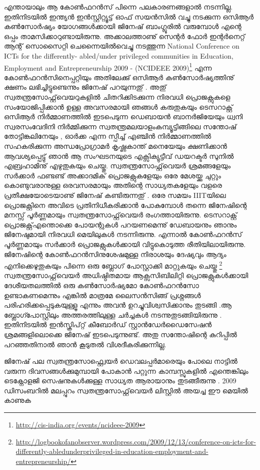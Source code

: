 എന്തായാലും ആ കോണ്‍ഫറന്‍സ് പിന്നെ പലകാരണങ്ങളാല്‍ നടന്നില്ല. ഇതിനിടയില്‍ ഇന്ത്യന്‍ ഇന്‍സ്റ്റിറ്റ്യൂട്ട് ഓഫ് സയന്‍സില്‍ വച്ചു നടക്കുന്ന ഒസിആര്‍ കണ്‍സോര്‍ഷ്യം  യോഗങ്ങള്‍ക്കായി ജിനേഷ് ബാംഗ്ലൂരില്‍ വരുമ്പോള്‍ എന്റെ ഒപ്പം താമസിക്കാറുണ്ടായിരുന്നു. അക്കാലത്താണു് സെന്റര്‍ ഫോര്‍ ഇന്റര്‍നെറ്റ് ആന്റ് സൊസൈറ്റി ചെന്നൈയില്‍വെച്ചു നടത്തുന്ന National Conference on ICTs for the differently- abled/under privileged communities in Education, Employment and Entrepreneurship 2009 - (NCIDEEE 2009)\footnote{\url{http://cis-india.org/events/ncideee-2009}} എന്ന കോണ്‍ഫറന്‍സിനെപ്പറ്റിയും അതിലേക്കു് ഒസിആര്‍ കണ്‍സോര്‍ഷ്യത്തിനു് ക്ഷണം ലഭിച്ചിട്ടുണ്ടെന്നും ജിനേഷ് പറയുന്നതു് . അതു് സ്വതന്ത്രസോഫ്റ്റ്‌വെയറുകളില്‍ ചിതറിക്കിടക്കുന്ന നിരവധി പ്രൊജക്റ്റുകളെ സംയോജിപ്പിക്കാന്‍ ഉള്ള അവസരമായി ഞങ്ങള്‍ കരുതുകയും ടെസറാക്റ്റ് ഒസിആര്‍ നിര്‍മ്മാണത്തില്‍ ഇടപെടുന്ന ഡെബായന്‍ ബാനര്‍ജിയേയും ധ്വനി സ്വരസംവേദിനി നിര്‍മ്മിക്കുന്ന സ്വതന്ത്രമലയാളംകമ്പ്യൂട്ടിങ്ങിലെ  സന്തോഷ് തോട്ടിങ്കലിനേയും , ഓര്‍ക്ക എന്ന സ്പീച്ച് എഞ്ചിന്‍ നിര്‍മ്മാണത്തില്‍ സഹകരിക്കുന്ന അന്ധപ്രോഗ്രാമര്‍ കൃഷ്ണകാന്ത് മനെയേയും ക്ഷണിക്കാന്‍ ആവശ്യപ്പെട്ടു് ഞാന്‍ ആ സംഘടനയുടെ എക്സിക്യുട്ടീവ് ഡയറക്ടര്‍ സുനില്‍ എബ്രഹാമിനു് എഴുതുകയും ചെയ്തു. സ്വതന്ത്രസോഫ്റ്റ്‌വെയര്‍ ശ്രമങ്ങളേയും സര്‍ക്കാര്‍ ഫണ്ടണ്ട് അക്കാദമിക് പ്രൊജക്റ്റുകളേയും ഒരേ മേശയ്ക്കു ചുറ്റും കൊണ്ടുവരാനുള്ള ഒരവസരമായും അതിന്റെ സാധ്യതകളേയും വളരെ പ്രതീക്ഷയോടെയാണു് ജിനേഷ് കണ്ടിരുന്നതു് . ഒരേ സമയം IIITയിലെ പ്രൊജക്റ്റിനെ അവിടെ പ്രതിനിധീകരിക്കാന്‍ പോകുമ്പോള്‍ തന്നെ ജിനേഷിന്റെ മനസ്സ് പൂര്‍ണ്ണമായും സ്വതന്ത്രസോഫ്റ്റ്‌വെയര്‍ രംഗത്തായിരുന്നു. ടെസറാക്റ്റ് പ്രൊജക്റ്റ്എന്തൊക്കെ  പോയന്റുകള്‍ പറയണമെന്നു് ഡേബായനും ഞാനും ജിനേഷുമായി നിരവധി മെയിലുകള്‍ നടന്നിരുന്നു. എന്നാല്‍ കോണ്‍ഫറന്‍സ് പൂര്‍ണ്ണമായും സര്‍ക്കാര്‍ പ്രൊജക്റ്റുകള്‍ക്കായി വിട്ടുകൊടുത്ത രീതിയിലായിരുന്നു. ജിനേഷിന്റെ കോണ്‍ഫറന്‍സിനുശേഷമുള്ള നിരാശയും ദേഷ്യവും ആദ്യം എനിക്കെഴുതുകയും പിന്നെ  ഒരു ബ്ലോഗ് പോസ്റ്റാക്കി മാറ്റുകയും ചെയ്തു \footnote{\url{http://logbookofanobserver.wordpress.com/2009/12/13/conference-on-icts-for-differently-abledunderprivileged-in-education-employment-and-entrepreneurship/}} സ്വതന്ത്രസോഫ്റ്റ്‌വെയര്‍ അധിഷ്ഠിതമായ ആക്സസിബിലിറ്റി പ്രൊജക്റ്റുകള്‍ക്കായി ദേശീയതലത്തില്‍ ഒരു കണ്‍സോര്‍ഷ്യമോ കോണ്‍ഫറന്‍സോ ഉണ്ടാകണമെന്നും എങ്കില്‍ മാത്രമേ ലൈസന്‍സിങ്ങ് പ്രശ്നങ്ങള്‍ പരിഹരിക്കപ്പെടുകയുള്ളൂ എന്നും അവന്‍ ഉറച്ചുവിശ്വസിക്കാനും തുടങ്ങി .ആ ബ്ലോഗ്പോസ്റ്റിലും അത്തരത്തിലുള്ള ചര്‍ച്ചകള്‍ നടന്നുതുടങ്ങിയിരുന്നു . ഇതിനിടയില്‍ ഇന്‍സ്ക്രിപ്റ്റ് കീബോര്‍ഡ് സ്റ്റാന്‍ഡേര്‍ഡൈസേഷന്‍ ശ്രമങ്ങളിലൊക്കെ ജിനേഷ് ഇടപെടുന്നുണ്ട്. അതു സന്തോഷിന്റെ കുറിപ്പില്‍ പറഞ്ഞതിനാല്‍ ഞാന്‍ കൂടുതല്‍ വിശദീകരിക്കുന്നില്ല.

ജിനേഷ് പല സ്വതന്ത്രസോഫ്റ്റ്വെയര്‍ ഡെവലപ്പര്‍മാരെയും പോലെ നാട്ടില്‍ വരുന്ന ദിവസങ്ങള്‍ക്കുമുമ്പായി പോകാന്‍ പറ്റുന്ന കാമ്പസ്സുകളില്‍ എന്തെങ്കിലും ടെക്നോളജി സെഷനുകള്‍ക്കുള്ള സാധ്യത ആരായാനും തുടങ്ങീരുന്നു . 2009 ഡിസംബറില്‍ മലപ്പുറം സ്വതന്ത്രസോഫ്റ്റ്‌വെയര്‍ ലിസ്റ്റില്‍ അയച്ച ഈ മെയില്‍ കാണുക 


